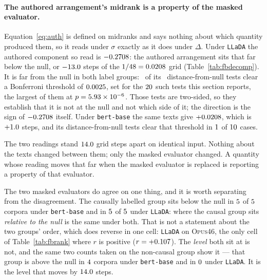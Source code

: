 \paragraph{The authored arrangement's midrank is a property of the
masked evaluator.}
Equation~\eqref{eq:auth} is defined on midranks and says nothing about
which quantity produced them, so it reads under $\sigma$ exactly as it does
under $\Delta$.  Under \texttt{LLaDA} the authored component so read is
$-0.2708$: the authored arrangement sits that
far below the null, or $-13.0$ steps of the
$1/48 = 0.0208$ grid (Table~\ref{tab:fbdecomp}).  It is far from the null in both
label groups: \FbDispNRejectingLLaDA\ of its \FbNTestsDispLLaDA\
distance-from-null tests clear a Bonferroni threshold of
$0.0025$, set for the $20$ such tests this section
reports, the largest of them at $p = 5.93\times10^{-6}$.  Those tests are
two-sided, so they establish that it is not at the null and not which side of it; the
direction is the sign of $-0.2708$ itself.  Under
\texttt{bert-base} the same texts give $+0.0208$, which is
$+1.0$ steps, and its distance-from-null tests clear that
threshold in $1$ of $10$ cases.

The two readings stand $14.0$ grid steps apart on identical input.
Nothing about the texts changed between them; only the masked evaluator
changed.  A
quantity whose reading moves that far when the masked evaluator is replaced
is reporting a property of that evaluator.

The two masked evaluators do agree on one thing, and it is worth separating from
the disagreement.  The causally labelled group sits below the null in
$5$ of $5$ corpora under
\texttt{bert-base} and in $5$ of $5$
under \texttt{LLaDA}: where the causal group sits \emph{relative to the
null} is the same under both.  That is not a statement about the two groups'
order, which does reverse in one cell: \texttt{LLaDA} on \textsc{Opus46},
the only cell of Table~\ref{tab:fbrank} where $r$ is positive
($r = +0.107$).  The
\emph{level} both sit at is not, and the same two counts taken on the
non-causal group show it --- that group is above the null in
$4$ corpora under \texttt{bert-base} and in
$0$ under \texttt{LLaDA}.  It is the level that moves by
$14.0$ steps.

